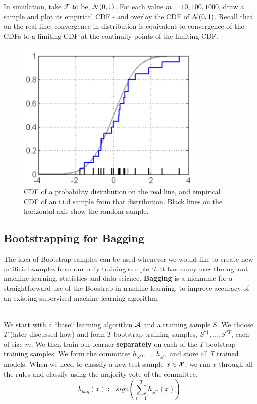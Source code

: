 \begin{exercise}
In simulation, take $\mathcal{F}$ to be, $\mathcal{N}(0,1)$. For each value $m=10,100,1000$, draw a sample and plot its empirical CDF - and overlay the CDF of $\mathcal{N}(0,1)$. Recall that on the real line, convergence in distribution is equivalent to convergence of the CDFs to a limiting CDF at the continuity points of the limiting CDF.
\end{exercise}

\begin{figure}[h!]
	\centering
	\includegraphics[width=3.5in]{chapters/ensemble.methods/figures/ecdf.png}  
	\caption{CDF of a probability distribution on the real line, and empirical CDF of an i.i.d sample from that distribution. Black lines on the horizontal axis show the random sample.}
	\label{ecdf}
\end{figure}
\subsection{Bootstrapping for Bagging}
The idea of Bootstrap samples can be used whenever we would like to create new artificial samples from our only training sample $S$. It has many uses throughout machine learning, statistics and data science. \textbf{Bagging} is a nickname for a straightforward use of the Boostrap in machine learning, to improve accuracy of an existing supervised machine learning algorithm.

~\\
We start with a ``base`` learning algorithm $\mathcal{A}$ and a training sample $S$. We choose $T$ (later discussed how) and form $T$ bootstrap training samples, $S^{*1},\ldots, S^{*T}$, each of size $m$. We then train our learner \textbf{separately} on each of the $T$ bootstrap training samples. We form the committee $h_{S^{*1}},\ldots,h_{S^{*T}}$ and store all $T$ trained models. When we need to classify a new test sample $x\in\mathcal{X}$, we run $x$ through all the rules and classify using the majority vote of the committee,
$$
h_{bag}(x) \coloneqq sign\left( \sum_{t=1}^T h_{S^{*t}} (x)\right)
$$

